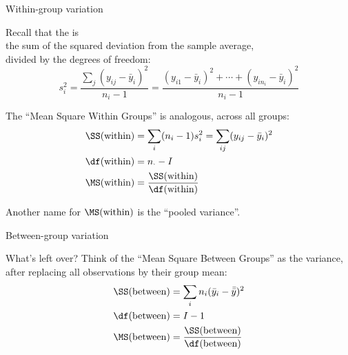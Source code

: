 \begin{frame}{Within-group variation}

  Recall that the  is \\
  the sum of the squared deviation from the sample average,\\
  divided by the degrees of freedom:
  \[
  s_i^2 = \frac{ \sum_j (y_{ij}-\bar y_i)^2 }{ n_i-1 } = \frac{ (y_{i1} - \bar y_i)^2 + \cdots + (y_{in_i} - \bar y_i)^2 }{n_i-1}
  \]

    \vspace{2em}

    The ``\alert{Mean Square Within Groups}'' is analogous, across all groups:
    \begin{align*}
      \SS(\text{within}) &= \sum_{i} (n_i-1) s_i^2 = \sum_{ij} (y_{ij}-\bar y_i)^2 \\
      \df(\text{within}) &= n_\cdot - I \\
      \MS(\text{within}) &= \frac{\SS(\text{within})}{\df(\text{within})}
    \end{align*}

    Another name for $\MS(\text{within})$ is the ``pooled variance''.

\end{frame}

\begin{frame}{Between-group variation}

  What's left over? 
  Think of the ``\alert{Mean Square Between Groups}'' 
  as the variance, after replacing all observations by their group mean:
  \begin{align*}
    \SS(\text{between}) &= \sum_{i} n_i (\bar y_i - \bar{\bar y})^2 \\
      \df(\text{between}) &= I - 1 \\
      \MS(\text{between}) &= \frac{\SS(\text{between})}{\df(\text{between})}
  \end{align*}

\end{frame}

